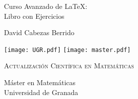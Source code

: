 
\begin{titlepage}
\begin{center}


{\huge
  Curso Avanzado de \LaTeX: \\Libro con Ejercicios
}

\bigskip

{\large
  \textsf{David Cabezas Berrido}
}

\vfill

\texttt{[image: UGR.pdf]}
\hfill
\texttt{[image: master.pdf]}

\vfill

\textsc{Actualización Científica en Matemáticas}

Máster en Matemáticas \\
Universidad de Granada

\monthname \ \the\year

\end{center}
\end{titlepage}